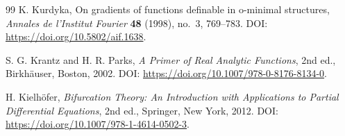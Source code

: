 \documentclass[11pt]{article}
\numberwithin{equation}{section}
\theoremstyle{plain}
\theoremstyle{definition}
\theoremstyle{remark}
\begin{document}
\begin{thebibliography}{99}
K. Kurdyka,
On gradients of functions definable in o-minimal structures,
\emph{Annales de l'Institut Fourier} \textbf{48} (1998), no.~3, 769--783.
DOI: \url{https://doi.org/10.5802/aif.1638}.

S. G. Krantz and H. R. Parks,
\emph{A Primer of Real Analytic Functions}, 2nd ed.,
Birkh\"auser, Boston, 2002.
DOI: \url{https://doi.org/10.1007/978-0-8176-8134-0}.


H. Kielh\"ofer,
\emph{Bifurcation Theory: An Introduction with Applications to Partial Differential Equations},
2nd ed., Springer, New York, 2012.
DOI: \url{https://doi.org/10.1007/978-1-4614-0502-3}.

\end{thebibliography}
\end{document}
